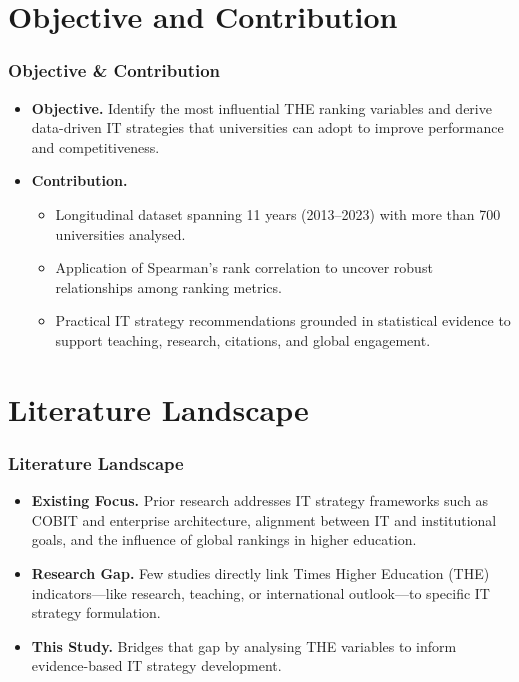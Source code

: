 \documentclass[aspectratio=169, table]{beamer}
\begin{document}
\section{Objective and Contribution}
\begin{frame}
	\vspace{20pt}
	\frametitle{Objective \& Contribution}
	\begin{itemize}
		\item \textbf{Objective.} Identify the most influential THE ranking variables and derive data-driven IT strategies that universities can adopt to improve performance and competitiveness.
		\item \textbf{Contribution.}
		\begin{itemize}
			\item Longitudinal dataset spanning 11 years (2013–2023) with more than 700 universities analysed.
			\item Application of Spearman’s rank correlation to uncover robust relationships among ranking metrics.
			\item Practical IT strategy recommendations grounded in statistical evidence to support teaching, research, citations, and global engagement.
		\end{itemize}
	\end{itemize}
\end{frame}


\section{Literature Landscape}
\begin{frame}
	\vspace{20pt}
	\frametitle{Literature Landscape}
	\begin{itemize}
		\item \textbf{Existing Focus.} Prior research addresses IT strategy frameworks such as COBIT and enterprise architecture, alignment between IT and institutional goals, and the influence of global rankings in higher education.
		\item \textbf{Research Gap.} Few studies directly link Times Higher Education (THE) indicators—like research, teaching, or international outlook—to specific IT strategy formulation.
		\item \textbf{This Study.} Bridges that gap by analysing THE variables to inform evidence-based IT strategy development.
	\end{itemize}
\end{frame}
\end{document}
